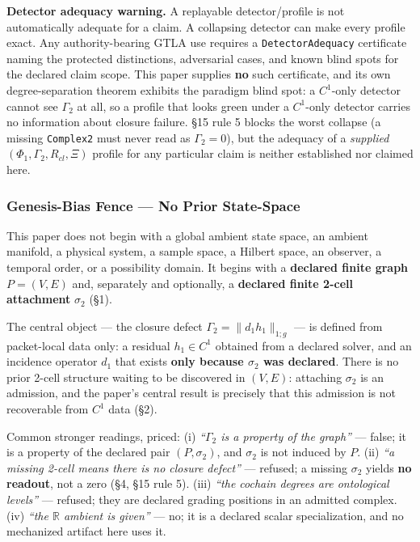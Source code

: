 \documentclass[
]{article}
\begin{document}
\textbf{Detector adequacy warning.} A replayable detector/profile is not automatically adequate for a claim. A collapsing detector can make every profile exact. Any authority-bearing GTLA use requires a \texttt{DetectorAdequacy} certificate naming the protected distinctions, adversarial cases, and known blind spots for the declared claim scope. This paper supplies \textbf{no} such certificate, and its own degree-separation theorem exhibits the paradigm blind spot: a \(C^1\)-only detector cannot see \(\Gamma_2\) at all, so a profile that looks green under a \(C^1\)-only detector carries no information about closure failure. §15 rule 5 blocks the worst collapse (a missing \texttt{Complex2} must never read as \(\Gamma_2=0\)), but the adequacy of a \emph{supplied} \((\Phi_1,\Gamma_2,R_{cl},\Xi)\) profile for any particular claim is neither established nor claimed here.

\subsubsection{Genesis-Bias Fence --- No Prior State-Space}\label{genesis-bias-fence-no-prior-state-space}

This paper does not begin with a global ambient state space, an ambient manifold, a physical system, a sample space, a Hilbert space, an observer, a temporal order, or a possibility domain. It begins with a \textbf{declared finite graph} \(P=(V,E)\) and, separately and optionally, a \textbf{declared finite 2-cell attachment} \(\sigma_2\) (§1).

The central object --- the closure defect \(\Gamma_2=\|d_1h_1\|_{1;g}\) --- is defined from packet-local data only: a residual \(h_1\in C^1\) obtained from a declared solver, and an incidence operator \(d_1\) that exists \textbf{only because \(\sigma_2\) was declared}. There is no prior 2-cell structure waiting to be discovered in \((V,E)\): attaching \(\sigma_2\) is an admission, and the paper's central result is precisely that this admission is not recoverable from \(C^1\) data (§2).

Common stronger readings, priced: (i) \emph{``\(\Gamma_2\) is a property of the graph''} --- false; it is a property of the declared pair \((P,\sigma_2)\), and \(\sigma_2\) is not induced by \(P\). (ii) \emph{``a missing 2-cell means there is no closure defect''} --- refused; a missing \(\sigma_2\) yields \textbf{no readout}, not a zero (§4, §15 rule 5). (iii) \emph{``the cochain degrees are ontological levels''} --- refused; they are declared grading positions in an admitted complex. (iv) \emph{``the \(\mathbb{R}\) ambient is given''} --- no; it is a declared scalar specialization, and no mechanized artifact here uses it.
\end{document}
